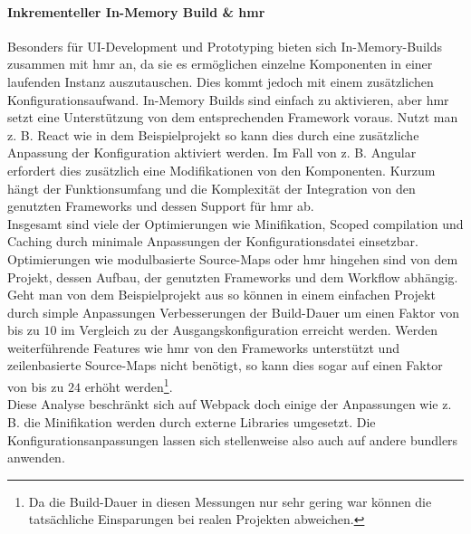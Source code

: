 \documentclass[11pt]{report}
\begin{document}
			\paragraph{Inkrementeller In-Memory Build \& \Gls{hmr}} Besonders für UI-Development und Prototyping bieten sich In-Memory-Builds zusammen mit \Gls{hmr} an, da sie es ermöglichen einzelne Komponenten in einer laufenden Instanz auszutauschen. Dies kommt jedoch mit einem zusätzlichen Konfigurationsaufwand. In-Memory Builds sind einfach zu aktivieren, aber \Gls{hmr} setzt eine Unterstützung von dem entsprechenden Framework voraus. Nutzt man z. B. React wie in dem Beispielprojekt so kann dies durch eine zusätzliche Anpassung der Konfiguration aktiviert werden. Im Fall von z. B. Angular erfordert dies zusätzlich eine Modifikationen von den Komponenten\cite{frameworks:angular-hmr}. Kurzum hängt der Funktionsumfang und die Komplexität der Integration von den genutzten Frameworks und dessen Support für \Gls{hmr} ab.\\
			
			Insgesamt sind viele der Optimierungen wie Minifikation, Scoped compilation und Caching durch minimale Anpassungen der Konfigurationsdatei einsetzbar. Optimierungen wie modulbasierte Source-Maps oder \Gls{hmr} hingehen sind von dem Projekt, dessen Aufbau, der genutzten Frameworks und dem Workflow abhängig.\\
			Geht man von dem Beispielprojekt aus so können in einem einfachen Projekt durch simple Anpassungen Verbesserungen der Build-Dauer um einen Faktor von bis zu $10$ im Vergleich zu der Ausgangskonfiguration erreicht werden. Werden weiterführende Features wie \Gls{hmr} von den Frameworks unterstützt und zeilenbasierte Source-Maps nicht benötigt, so kann dies sogar auf einen Faktor von bis zu $24$ erhöht werden\footnote{Da die Build-Dauer in diesen Messungen nur sehr gering war können die tatsächliche Einsparungen bei realen Projekten abweichen.}.\\
			Diese Analyse beschränkt sich auf Webpack doch einige der Anpassungen wie z. B. die Minifikation\cite{frameworks:uglifyJS} werden durch externe Libraries umgesetzt. Die Konfigurationsanpassungen lassen sich stellenweise also auch auf andere \Glspl{bundler} anwenden.
\end{document}
